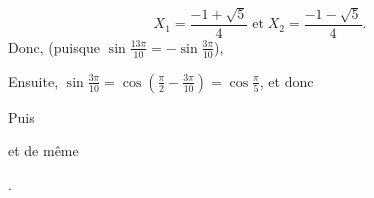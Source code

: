{\begin{enumerate}
{$$X_1=\frac{-1+\sqrt{5}}{4}\;\mbox{et}\;X_2=\frac{-1-\sqrt{5}}{4}.$$
Donc, (puisque $\sin\frac{13\pi}{10}=-\sin\frac{3\pi}{10}$),

\begin{center}
\end{center}
Ensuite, $\sin\frac{3\pi}{10}=\cos\left(\frac{\pi}{2}-\frac{3\pi}{10}\right)=\cos\frac{\pi}{5}$, et donc

\begin{center}
\end{center}
Puis

\begin{center}
\end{center}
et de même 

\begin{center}
.
\end{center}}
\end{enumerate}
}